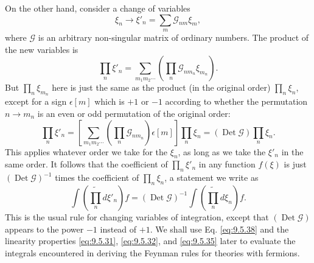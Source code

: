 On the other hand, consider a change of variables
\begin{equation}
\xi_n\longrightarrow\xi'_n=\sum_m\mathcal{G}_{nm}\xi_m,
\tag{9.5.37}\label{eq:9.5.37}
\end{equation}
where $\mathcal{G}$ is an arbitrary non-singular matrix of ordinary numbers.
The product of the new variables is
\[
\prod_n\xi'_n
=\sum_{m_1m_2\cdots}\left(\prod_n\mathcal{G}_{nm_n}\xi_{m_n}\right).
\]
But $\prod_n\xi_{m_n}$ here is just the same as the product (in the original
order) $\prod_n\xi_n$, except for a sign $\epsilon[m]$ which is $+1$ or $-1$
according to whether the permutation $n\to m_n$ is an even or odd permutation
of the original order:
\[
\prod_n\xi'_n
=\left[\sum_{m_1m_2\cdots}
 \left(\prod_n\mathcal{G}_{nm_n}\right)\epsilon[m]\right]
 \prod_n\xi_n
=(\operatorname{Det}\mathcal{G})\prod_n\xi_n.
\]
This applies whatever order we take for the $\xi_n$, as long as we take the
$\xi'_n$ in the same order. It follows that the coefficient of
$\prod_n\xi'_n$ in any function $f(\xi)$ is just
$(\operatorname{Det}\mathcal{G})^{-1}$ times the coefficient of
$\prod_n\xi_n$, a statement we write as
\begin{equation}
\int\left(\widetilde{\prod_n}d\xi'_n\right)f
=(\operatorname{Det}\mathcal{G})^{-1}
 \int\left(\widetilde{\prod_n}d\xi_n\right)f.
\tag{9.5.38}\label{eq:9.5.38}
\end{equation}
This is the usual rule for changing variables of integration, except that
$(\operatorname{Det}\mathcal{G})$ appears to the power $-1$ instead of $+1$.
We shall use Eq. \eqref{eq:9.5.38} and the linearity properties \eqref{eq:9.5.31}, \eqref{eq:9.5.32}, and
\eqref{eq:9.5.35} later to evaluate the integrals encountered in deriving the Feynman
rules for theories with fermions.

